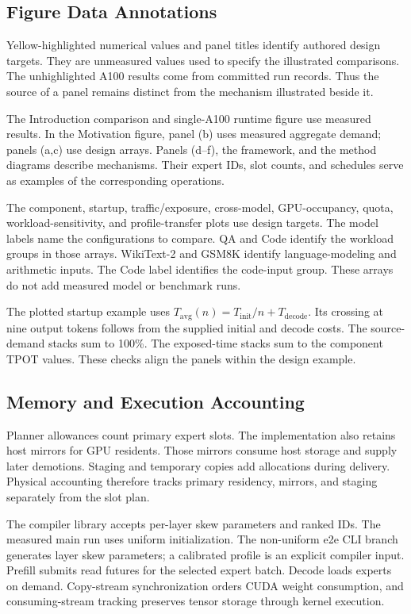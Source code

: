 \documentclass[conference,9pt,letterpaper]{IEEEtran}
\begin{document}
\subsection{Figure Data Annotations}
Yellow-highlighted numerical values and panel titles identify authored design targets. They are unmeasured values used to specify the illustrated comparisons. The unhighlighted A100 results come from committed run records. Thus the source of a panel remains distinct from the mechanism illustrated beside it.

The Introduction comparison and single-A100 runtime figure use measured results. In the Motivation figure, panel (b) uses measured aggregate demand; panels (a,c) use design arrays. Panels (d--f), the framework, and the method diagrams describe mechanisms. Their expert IDs, slot counts, and schedules serve as examples of the corresponding operations.

The component, startup, traffic/exposure, cross-model, GPU-occupancy, quota, workload-sensitivity, and profile-transfer plots use design targets. The model labels name the configurations to compare. QA and Code identify the workload groups in those arrays. WikiText-2 and GSM8K identify language-modeling and arithmetic inputs. The Code label identifies the code-input group. These arrays do not add measured model or benchmark runs.

The plotted startup example uses $T_{\mathrm{avg}}(n)=T_{\mathrm{init}}/n+T_{\mathrm{decode}}$. Its crossing at nine output tokens follows from the supplied initial and decode costs. The source-demand stacks sum to 100\%. The exposed-time stacks sum to the component TPOT values. These checks align the panels within the design example.

\subsection{Memory and Execution Accounting}
Planner allowances count primary expert slots. The implementation also retains host mirrors for GPU residents. Those mirrors consume host storage and supply later demotions. Staging and temporary copies add allocations during delivery. Physical accounting therefore tracks primary residency, mirrors, and staging separately from the slot plan.

The compiler library accepts per-layer skew parameters and ranked IDs. The measured main run uses uniform initialization. The non-uniform e2e CLI branch generates layer skew parameters; a calibrated profile is an explicit compiler input. Prefill submits read futures for the selected expert batch. Decode loads experts on demand. Copy-stream synchronization orders CUDA weight consumption, and consuming-stream tracking preserves tensor storage through kernel execution.
\end{document}
